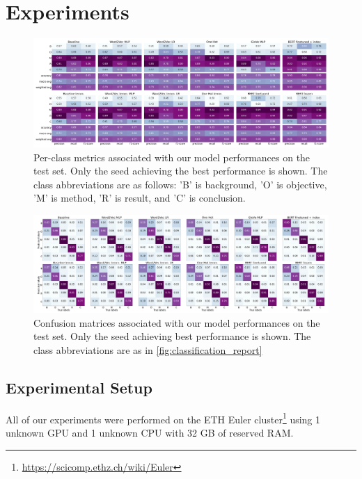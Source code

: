 \section{Experiments}
\label{sec:experiments}

\begin{figure}[t]
    \centering
    \includegraphics[width=1\textwidth]{figures/classification_report.png}
    \caption{Per-class metrics associated with our model performances on the test set. Only the seed achieving the best performance is shown. The class abbreviations are as follows: 'B' is background, 'O' is objective, 'M' is method, 'R' is result, and 'C' is conclusion.}
    \label{fig:classification_report}
\end{figure}

\begin{figure}[t]
    \centering
    \includegraphics[width=1\textwidth]{figures/confusion_matrices.png}
    \caption{Confusion matrices associated with our model performances on the test set. Only the seed achieving best performance is shown. The class abbreviations are as in \autoref{fig:classification_report}}
    \label{fig:confusion_matrices}
\end{figure}

\subsection{Experimental Setup}
All of our experiments were performed on the ETH Euler cluster\footnote{\url{https://scicomp.ethz.ch/wiki/Euler}} using 1 unknown GPU and 1 unknown CPU with 32 GB of reserved RAM.%

